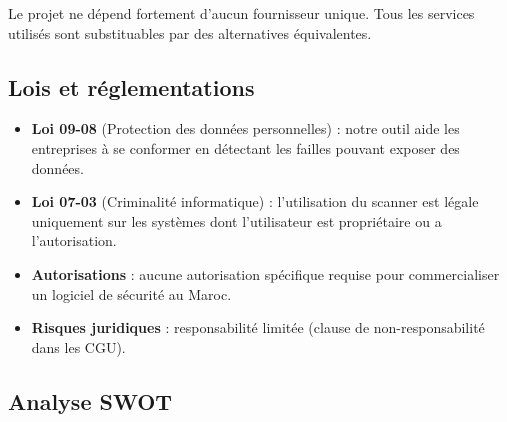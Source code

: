 \documentclass[12pt,a4paper]{report}
\begin{document}
Le projet ne dépend fortement d'aucun fournisseur unique. Tous les services utilisés sont substituables par des alternatives équivalentes.

\subsection{Lois et réglementations}

\begin{itemize}
  \item \textbf{Loi 09-08} (Protection des données personnelles) : notre outil aide les entreprises à se conformer en détectant les failles pouvant exposer des données.
  \item \textbf{Loi 07-03} (Criminalité informatique) : l'utilisation du scanner est légale uniquement sur les systèmes dont l'utilisateur est propriétaire ou a l'autorisation.
  \item \textbf{Autorisations} : aucune autorisation spécifique requise pour commercialiser un logiciel de sécurité au Maroc.
  \item \textbf{Risques juridiques} : responsabilité limitée (clause de non-responsabilité dans les CGU).
\end{itemize}

\subsection{Analyse SWOT}
\end{document}
